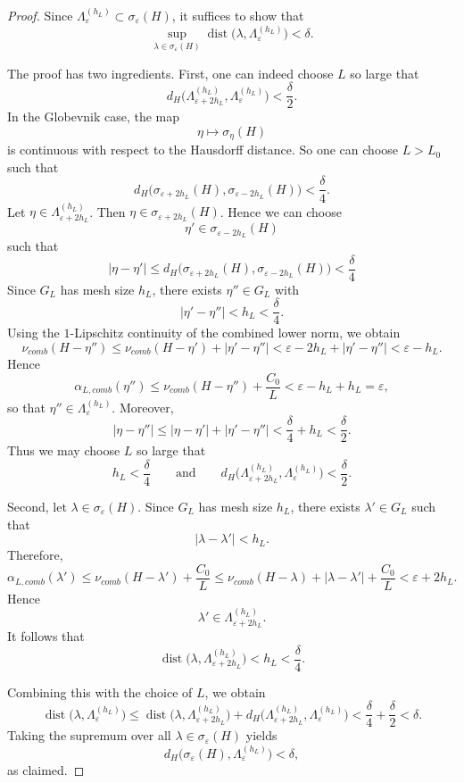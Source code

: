 \documentclass[11pt]{article}
\theoremstyle{definition}
\newcommand{\dist}{\operatorname{dist}}
\begin{document}
\begin{proof}
Since $\Lambda_\varepsilon^{(h_L)}\subset \sigma_\varepsilon(H)$, it suffices to show that
\[
\sup_{\lambda\in\sigma_\varepsilon(H)}
\dist\bigl(\lambda,\Lambda_\varepsilon^{(h_L)}\bigr)<\delta.
\]

The proof has two ingredients. First, one can indeed choose $L$ so large that
\[
d_H\bigl(\Lambda_{\varepsilon+2h_L}^{(h_L)},\Lambda_\varepsilon^{(h_L)}\bigr)<\frac{\delta}{2}.
\]
In the Globevnik case, the map
\[
\eta\longmapsto \sigma_\eta(H)
\]
is continuous with respect to the Hausdorff distance. So one can choose $L>L_0$ such that
\[
d_H\bigl(\sigma_{\varepsilon+2h_L}(H),\sigma_{\varepsilon-2h_L}(H)\bigr) < \frac{\delta}{4}.
\]
Let $\eta\in \Lambda_{\varepsilon+2h_L}^{(h_L)}$. Then $\eta\in \sigma_{\varepsilon+2h_L}(H)$. Hence we can choose
\[
\eta'\in \sigma_{\varepsilon-2h_L}(H)
\]
such that
\[
|\eta-\eta'|
\le d_H\bigl(\sigma_{\varepsilon+2h_L}(H),\sigma_{\varepsilon-2h_L}(H)\bigr) < \frac{\delta}{4}
\]
Since $G_L$ has mesh size $h_L$, there exists $\eta''\in G_L$ with
\[
|\eta'-\eta''|< h_L < \frac{\delta}{4}.
\]
Using the $1$-Lipschitz continuity of the combined lower norm, we obtain
\[
\nu_{comb}(H-\eta'')
\le \nu_{comb}(H-\eta')+|\eta'-\eta''|
< \varepsilon-2h_L+|\eta'-\eta''|
< \varepsilon-h_L.
\]
Hence
\[
\alpha_{L,comb}(\eta'')
\le \nu_{comb}(H-\eta'')+\frac{C_0}{L}
< \varepsilon-h_L+h_L
= \varepsilon,
\]
so that $\eta''\in \Lambda_\varepsilon^{(h_L)}$. Moreover,
\[
|\eta-\eta''|
\le |\eta-\eta'|+|\eta'-\eta''|
< \frac{\delta}{4}+h_L < \frac{\delta}{2}.
\]
\noindent
Thus we may choose $L$ so large that
\[
h_L<\frac{\delta}{4}
\qquad\text{and}\qquad
d_H\bigl(\Lambda_{\varepsilon+2h_L}^{(h_L)},\Lambda_\varepsilon^{(h_L)}\bigr)<\frac{\delta}{2}.
\]

Second, let $\lambda\in \sigma_\varepsilon(H)$. Since $G_L$ has mesh size $h_L$, there exists $\lambda'\in G_L$ such that
\[
|\lambda-\lambda'|<h_L.
\]
Therefore,
\[
\alpha_{L,comb}(\lambda')
\le \nu_{comb}(H-\lambda')+\frac{C_0}{L}
\le \nu_{comb}(H-\lambda)+|\lambda-\lambda'|+\frac{C_0}{L}
< \varepsilon+2h_L.
\]
Hence
\[
\lambda'\in \Lambda_{\varepsilon+2h_L}^{(h_L)}.
\]
It follows that
\[
\dist\bigl(\lambda,\Lambda_{\varepsilon+2h_L}^{(h_L)}\bigr)<h_L<\frac{\delta}{4}.
\]

Combining this with the choice of $L$, we obtain
\[
\dist\bigl(\lambda,\Lambda_\varepsilon^{(h_L)}\bigr)
\le
\dist\bigl(\lambda,\Lambda_{\varepsilon+2h_L}^{(h_L)}\bigr)
+
d_H\bigl(\Lambda_{\varepsilon+2h_L}^{(h_L)},\Lambda_\varepsilon^{(h_L)}\bigr)
<
\frac{\delta}{4}+\frac{\delta}{2}
<
\delta.
\]
Taking the supremum over all $\lambda\in \sigma_\varepsilon(H)$ yields
\[
d_H\bigl(\sigma_\varepsilon(H),\Lambda_\varepsilon^{(h_L)}\bigr)<\delta,
\]
as claimed.
\end{proof}
\end{document}

